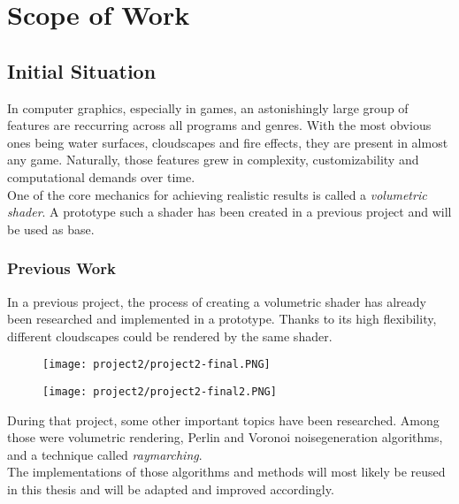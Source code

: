 \section{Scope of Work}

\subsection{Initial Situation}
In computer graphics, especially in games, an astonishingly large group of features are reccurring across all programs and genres.
With the most obvious ones being water surfaces, cloudscapes and fire effects, they are present in almost any game. 
Naturally, those features grew in complexity, customizability and computational demands over time.
\\
One of the core mechanics for achieving realistic results is called a \emph{\gls{volumetric} \gls{shader}}.
A prototype such a \gls{shader} has been created in a previous project and will be used as base.

\subsubsection{Previous Work}
In a previous project, the process of creating a \gls{volumetric} \gls{shader} has already been researched and implemented in a prototype. Thanks to its high flexibility, different cloudscapes could be rendered by the same shader.

\begin{figure}[ht]
    \centering
        \begin{minipage}{0.47\linewidth}
            \texttt{[image: project2/project2-final.PNG]}
        \end{minipage}
    \hfill
        \begin{minipage}{0.47\linewidth}
            \texttt{[image: project2/project2-final2.PNG]}
        \end{minipage}  
\end{figure}

\noindent
During that project, some other important topics have been researched. Among those were \gls{volumetric} rendering, Perlin and Voronoi \gls{noisegeneration} algorithms, and a technique called \emph{\gls{raymarching}}.
\\
The implementations of those algorithms and methods will most likely be reused in this thesis and will be adapted and improved accordingly.

